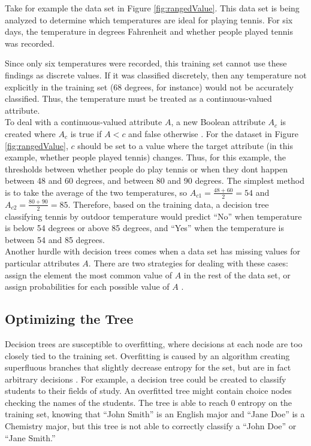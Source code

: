 \begin{exmp}
  Take for example the data set in Figure \ref{fig:rangedValue}. This data set is being analyzed to determine which temperatures are ideal for playing tennis. For six days, the temperature in degrees Fahrenheit and whether people played tennis was recorded.\\
\end{exmp}

Since only six temperatures were recorded, this training set cannot use these findings as discrete values. If it was classified discretely, then any temperature not explicitly in the training set (68 degrees, for instance) would not be accurately classified. Thus, the temperature must be treated as a continuous-valued attribute.\\

To deal with a continuous-valued attribute $A$, a new Boolean attribute $A_c$ is created where $A_c$ is true if $A<c$ and false otherwise \cite{mitc97}. For the dataset in Figure \ref{fig:rangedValue}, $c$ should be set to a value where the target attribute (in this example, whether people played tennis) changes. Thus, for this example, the thresholds between whether people do play tennis or when they dont happen between 48 and 60 degrees, and between 80 and 90 degrees. The simplest method is to take the average of the two temperatures, so $A_{c1}=\frac{48+60}{2}=54$ and $A_{c2}=\frac{80+90}{2}=85$. Therefore, based on the training data, a decision tree classifying tennis by outdoor temperature would predict ``No'' when temperature is below 54 degrees or above 85 degrees, and ``Yes'' when the temperature is between 54 and 85 degrees.\\

Another hurdle with decision trees comes when a data set has missing values for particular attributes $A$. There are two strategies for dealing with these cases: assign the element the most common value of $A$ in the rest of the data set, or assign probabilities for each possible value of $A$ \cite{mitc97}. 

\subsection{Optimizing the Tree}
Decision trees are susceptible to overfitting, where decisions at each node are too closely tied to the training set. Overfitting is caused by an algorithm creating superfluous branches that slightly decrease entropy for the set, but are in fact arbitrary decisions \cite{sega07}. For example, a decision tree could be created to classify students to their fields of study. An overfitted tree might contain choice nodes checking the names of the students. The tree is able to reach 0 entropy on the training set, knowing that ``John Smith'' is an English major and ``Jane Doe'' is a Chemistry major, but this tree is not able to correctly classify a ``John Doe'' or ``Jane Smith.''\\

